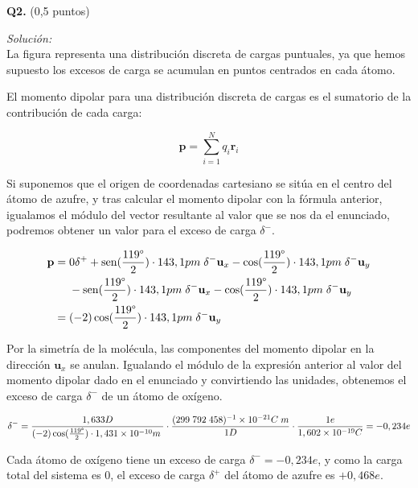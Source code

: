 \textbf{Q2.} (0,5 puntos)


\vspace{20px}
\textit{Solución:}
\\

La figura representa una distribución discreta de cargas puntuales, ya que hemos supuesto los excesos de carga se
acumulan en puntos centrados en cada átomo.

El momento dipolar para una distribución discreta de cargas es el sumatorio de la contribución de cada carga:

\begin{equation*}
    \mathbf{p} = \sum_{i = 1}^{N} q_i \mathbf{r}_i
\end{equation*}

Si suponemos que el origen de coordenadas cartesiano se sitúa en el centro del átomo de azufre, y tras calcular el momento
dipolar con la fórmula anterior, igualamos el módulo del vector resultante
al valor que se nos da el enunciado, podremos obtener un valor para el exceso de carga $\delta^-$.

\begin{align*}
    \mathbf{p} =\; &
    0\delta^+ + \operatorname{sen}(\frac{119\degree}{2}) \cdot 143,1 pm\; \delta^- \mathbf{u}_x
    - \cos(\frac{119\degree}{2}) \cdot 143,1 pm\; \delta^- \mathbf{u}_y\\
    & - \operatorname{sen}(\frac{119\degree}{2}) \cdot 143,1 pm\; \delta^- \mathbf{u}_x
    - \cos(\frac{119\degree}{2}) \cdot 143,1 pm\; \delta^- \mathbf{u}_y \\
    =\; & (-2) \cos(\frac{119\degree}{2}) \cdot 143,1 pm\; \delta^- \mathbf{u}_y \
\end{align*}

Por la simetría de la molécula, las componentes del momento dipolar en la dirección $\mathbf{u}_x$ se anulan. Igualando
el módulo de la expresión anterior al valor del momento dipolar dado en el enunciado y convirtiendo las unidades, obtenemos
el exceso de carga $\delta^-$ de un átomo de oxígeno.


\begin{align*}
    \delta^- = \frac{1,633 D}{(-2) \cos(\frac{119\degree}{2}) \cdot 1,431 \times 10^{-10}m\;}
    \cdot \frac{(299\;792\;458)^{-1} \times 10^{-21}C\;m}{1D} \cdot \frac{1e}{1,602 \times 10^{-19}C} = -0,234e
\end{align*}

Cada átomo de oxígeno tiene un exceso de carga $\delta^- = -0,234e$, y como la carga total del sistema es 0, el exceso de carga
$\delta^+$ del átomo de azufre es $+0,468e$.